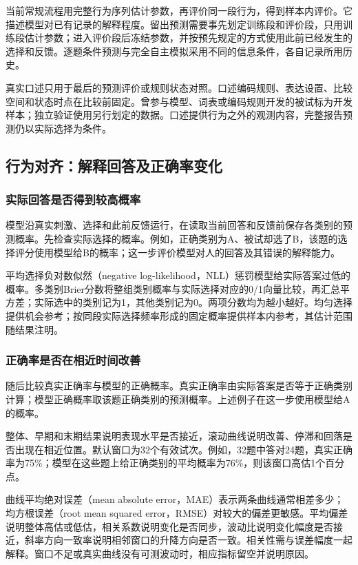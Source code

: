 \documentclass[12pt]{article}
\begin{document}
当前常规流程用完整行为序列估计参数，再评价同一段行为，得到样本内评价。它描述模型对已有记录的解释程度。留出预测需要事先划定训练段和评价段，只用训练段估计参数；进入评价段后冻结参数，并按预先规定的方式使用此前已经发生的选择和反馈。逐题条件预测与完全自主模拟采用不同的信息条件，各自记录所用历史。

真实口述只用于最后的预测评价或规则状态对照。口述编码规则、表达设置、比较空间和状态时点在比较前固定。曾参与模型、词表或编码规则开发的被试标为开发样本；独立验证使用另行划定的数据。口述提供行为之外的观测内容，完整报告预测仍以实际选择为条件。

\subsection{行为对齐：解释回答及正确率变化}
\label{sec:evaluation-2}

\subsubsection{实际回答是否得到较高概率}

模型沿真实刺激、选择和此前反馈运行，在读取当前回答和反馈前保存各类别的预测概率。先检查实际选择的概率。例如，正确类别为A、被试却选了B，该题的选择评分使用模型给B的概率；这一步评价模型对人的回答及其错误的解释能力。

平均选择负对数似然（negative log-likelihood，NLL）惩罚模型给实际答案过低的概率。多类别Brier分数将整组类别概率与实际选择对应的0/1向量比较，再汇总平方差；实际选中的类别记为1，其他类别记为0。两项分数均为越小越好。均匀选择提供机会参考；按同段实际选择频率形成的固定概率提供样本内参考，其估计范围随结果注明。

\subsubsection{正确率是否在相近时间改善}

随后比较真实正确率与模型的正确概率。真实正确率由实际答案是否等于正确类别计算；模型正确概率取该题正确类别的预测概率。上述例子在这一步使用模型给A的概率。

整体、早期和末期结果说明表现水平是否接近，滚动曲线说明改善、停滞和回落是否出现在相近位置。默认窗口为32个有效试次。例如，32题中答对24题，真实正确率为75\%；模型在这些题上给正确类别的平均概率为76\%，则该窗口高估1个百分点。

曲线平均绝对误差（mean absolute error，MAE）表示两条曲线通常相差多少；均方根误差（root mean squared error，RMSE）对较大的偏差更敏感。平均偏差说明整体高估或低估，相关系数说明变化是否同步，波动比说明变化幅度是否接近，斜率方向一致率说明相邻窗口的升降方向是否一致。相关性需与误差幅度一起解释。窗口不足或真实曲线没有可测波动时，相应指标留空并说明原因。
\end{document}
